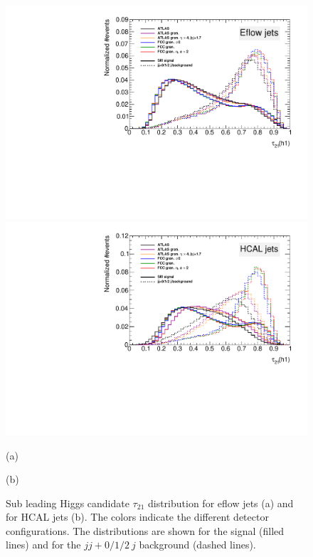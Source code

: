 \begin{figure}[h]
	\centering
	\begin{minipage}{.5\textwidth}
		\centering
		\includegraphics[trim={.65cm 0 0 0},clip,width=\linewidth]{./Figures/tau21_jj.pdf}
	\end{minipage}%
	\begin{minipage}{.5\textwidth}
		\centering
		\includegraphics[trim={0 0 .65cm 0},clip,width=\linewidth]{./Figures/tau21CALO_jj.pdf}
	\end{minipage}
	\begin{minipage}[t]{0.5\textwidth}
		\caption*{(a)}
	\end{minipage}%
	\hfill
	\begin{minipage}[t]{0.5\textwidth}
		\caption*{(b)}
	\end{minipage}
	\caption{Sub leading Higgs candidate $\tau_{21}$ distribution for eflow jets (a) and for HCAL jets (b). The colors indicate the different detector configurations. The distributions are shown for the signal (filled lines) and for the $jj+0/1/2~j$ background (dashed lines).}
	\label{fig:tau_sep_jj}
\end{figure} 

